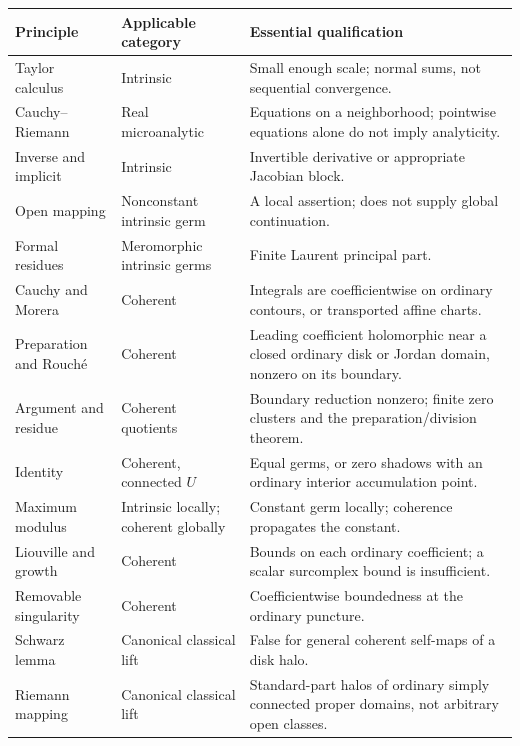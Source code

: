 \documentclass[11pt,letterpaper]{article}
\numberwithin{equation}{section}
\theoremstyle{definition}
\theoremstyle{remark}
\begin{document}
\small
\begin{longtable}{@{}p{}p{}p{}@{}}
\toprule
Principle & Applicable category & Essential qualification\\
\midrule
\endhead
Taylor calculus & Intrinsic & Small enough scale; normal sums, not
sequential convergence.\\[4pt]
Cauchy--Riemann & Real microanalytic & Equations on a neighborhood;
pointwise equations alone do not imply analyticity.\\[4pt]
Inverse and implicit & Intrinsic & Invertible derivative or appropriate
Jacobian block.\\[4pt]
Open mapping & Nonconstant intrinsic germ & A local assertion; does not
supply global continuation.\\[4pt]
Formal residues & Meromorphic intrinsic germs & Finite Laurent principal
part.\\[4pt]
Cauchy and Morera & Coherent & Integrals are coefficientwise on ordinary
contours, or transported affine charts.\\[4pt]
Preparation and Rouch\'e & Coherent & Leading coefficient holomorphic
near a closed ordinary disk or Jordan domain, nonzero on its boundary.\\[4pt]
Argument and residue & Coherent quotients & Boundary reduction nonzero;
finite zero clusters and the preparation/division theorem.\\[4pt]
Identity & Coherent, connected $U$ & Equal germs, or zero shadows with an
ordinary interior accumulation point.\\[4pt]
Maximum modulus & Intrinsic locally; coherent globally & Constant germ
locally; coherence propagates the constant.\\[4pt]
Liouville and growth & Coherent & Bounds on each ordinary coefficient;
a scalar surcomplex bound is insufficient.\\[4pt]
Removable singularity & Coherent & Coefficientwise boundedness at the
ordinary puncture.\\[4pt]
Schwarz lemma & Canonical classical lift & False for general coherent
self-maps of a disk halo.\\[4pt]
Riemann mapping & Canonical classical lift & Standard-part halos of
ordinary simply connected proper domains, not arbitrary open classes.\\
\bottomrule
\end{longtable}
\normalsize
\end{document}
